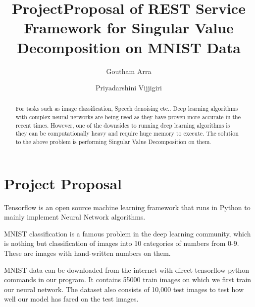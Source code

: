 
\title{ProjectProposal of REST Service Framework for Singular Value 
Decomposition on MNIST Data}

\author{Goutham Arra}

\author{Priyadarshini Vijjigiri}

\renewcommand{\shortauthors}{G. v. Laszewski}


\begin{abstract} 
For tasks such as image classification, Speech denoising etc..
Deep learning algorithms with complex  neural networks are being used as they
have proven more accurate in the recent  times. However, one of the downsides to
running deep learning algorithms is they can be computationally heavy and
require huge memory to execute. The solution to  the above problem is performing
Singular Value Decomposition on them.


\end{abstract}



\maketitle

\section{Project Proposal}

Tensorflow is an open source machine learning framework that runs in Python to 
mainly implement Neural Network algorithms. 

MNIST classification is a famous problem in the deep learning community, which
is  nothing but classification of images into 10 categories of numbers from 0-9.
These are images with hand-written numbers on them.

MNIST data can be downloaded from the internet with direct tensorflow python
commands in our program. It contains 55000 train images on which we first train 
our neural network. The dataset also consists of 10,000 test images to test
how well our model has fared on the test images.

